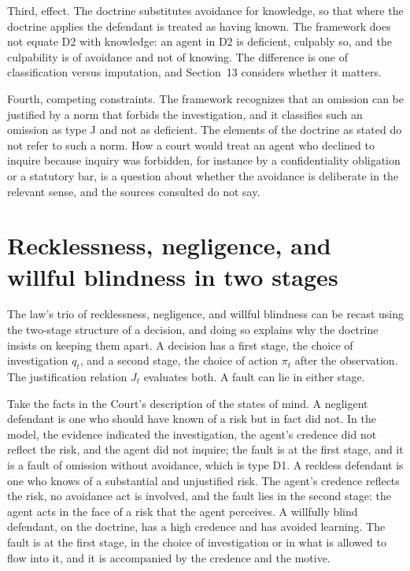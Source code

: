\documentclass[11pt]{article}
\theoremstyle{plain}
\theoremstyle{definition}
\begin{document}
Third, effect. The doctrine substitutes avoidance for knowledge, so that where the doctrine applies the defendant is treated as having known. The framework does not equate D2 with knowledge: an agent in D2 is deficient, culpably so, and the culpability is of avoidance and not of knowing. The difference is one of classification versus imputation, and Section~13 considers whether it matters.

Fourth, competing constraints. The framework recognizes that an omission can be justified by a norm that forbids the investigation, and it classifies such an omission as type J and not as deficient. The elements of the doctrine as stated do not refer to such a norm. How a court would treat an agent who declined to inquire because inquiry was forbidden, for instance by a confidentiality obligation or a statutory bar, is a question about whether the avoidance is deliberate in the relevant sense, and the sources consulted do not say.

\section{Recklessness, negligence, and willful blindness in two stages}

The law's trio of recklessness, negligence, and willful blindness can be recast using the two-stage structure of a decision, and doing so explains why the doctrine insists on keeping them apart. A decision has a first stage, the choice of investigation $q_t$, and a second stage, the choice of action $\pi_t$ after the observation. The justification relation $J_t$ evaluates both. A fault can lie in either stage.

Take the facts in the Court's description of the states of mind. A negligent defendant is one who should have known of a risk but in fact did not. In the model, the evidence indicated the investigation, the agent's credence did not reflect the risk, and the agent did not inquire; the fault is at the first stage, and it is a fault of omission without avoidance, which is type D1. A reckless defendant is one who knows of a substantial and unjustified risk. The agent's credence reflects the risk, no avoidance act is involved, and the fault lies in the second stage: the agent acts in the face of a risk that the agent perceives. A willfully blind defendant, on the doctrine, has a high credence and has avoided learning. The fault is at the first stage, in the choice of investigation or in what is allowed to flow into it, and it is accompanied by the credence and the motive.
\end{document}
